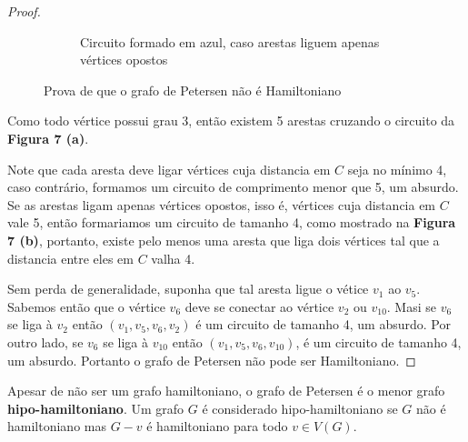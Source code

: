 \documentclass[11pt,a4paper]{exam}
\begin{document}
\begin{proof}
\begin{figure}[H]
\begin{subfigure}{.5\textwidth}
        \caption{Circuito formado em azul, caso arestas liguem apenas
         vértices opostos}
    \end{subfigure}
            \caption{Prova de que o grafo de Petersen não é Hamiltoniano}
\end{figure}
Como todo vértice possui grau 3, então existem 5 arestas cruzando o
    circuito da \textbf{Figura 7 (a)}.\par
    Note que cada aresta deve ligar
    vértices cuja distancia em $C$ seja no mínimo 4, caso contrário,
    formamos um circuito de comprimento menor que 5, um absurdo. Se as
    arestas ligam apenas vértices opostos, isso é, vértices cuja
    distancia em $C$ vale 5, então formariamos um circuito de tamanho 4,
    como mostrado na \textbf{Figura 7 (b)}, portanto, existe pelo menos
    uma aresta que liga dois vértices tal que a distancia entre
    eles em $C$ valha 4.\par
    Sem perda de generalidade, suponha que tal
    aresta ligue o vétice $v_1$ ao $v_5$. Sabemos então que o vértice
    $v_6$ deve se conectar ao vértice $v_2$ ou $v_{10}$. Masi se $v_6$ se
    liga à $v_2$ então $(v_1,v_5,v_6,v_2)$ é um circuito de tamanho 4,
    um absurdo.
    Por outro lado, se $v_6$ se liga à $v_{10}$ então
    $(v_1,v_5,v_6,v_{10})$, é um circuito de tamanho 4, um absurdo.
    Portanto o grafo de Petersen não pode ser Hamiltoniano.
\end{proof}
Apesar de não ser um grafo hamiltoniano, o grafo de Petersen é o menor grafo
\textbf{hipo-hamiltoniano}. Um grafo $G$ é considerado hipo-hamiltoniano se
$G$ não é hamiltoniano mas $G-v$ é hamiltoniano para todo $v \in V(G)$.
\end{document}
